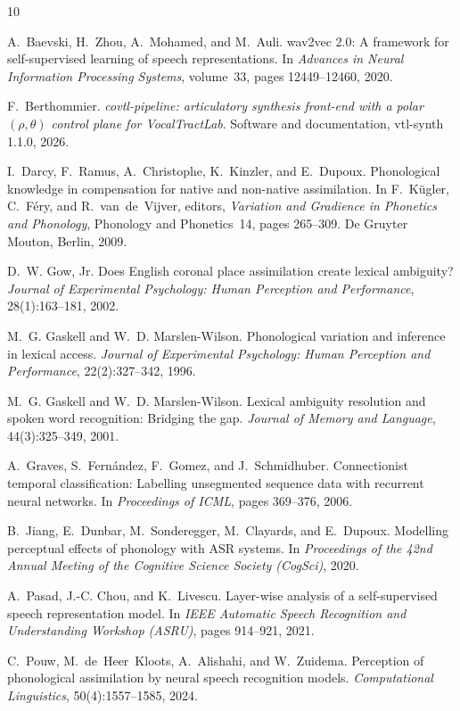 \documentclass[11pt,a4paper]{article}
\begin{document}
\begin{thebibliography}{10}
\small

A.~Baevski, H.~Zhou, A.~Mohamed, and M.~Auli.
\newblock wav2vec 2.0: A framework for self-supervised learning of speech
  representations.
\newblock In \emph{Advances in Neural Information Processing Systems},
  volume~33, pages 12449--12460, 2020.

F.~Berthommier.
\newblock \emph{covtl-pipeline: articulatory synthesis front-end with a
  polar $(\rho,\theta)$ control plane for {V}ocal{T}ract{L}ab}.
\newblock Software and documentation, vtl-synth 1.1.0, 2026.

I.~Darcy, F.~Ramus, A.~Christophe, K.~Kinzler, and E.~Dupoux.
\newblock Phonological knowledge in compensation for native and non-native
  assimilation.
\newblock In F.~K\"ugler, C.~F\'ery, and R.~van~de~Vijver, editors,
  \emph{Variation and Gradience in Phonetics and Phonology}, Phonology and
  Phonetics~14, pages 265--309. De Gruyter Mouton, Berlin, 2009.

D.~W. Gow, Jr.
\newblock Does {E}nglish coronal place assimilation create lexical
  ambiguity?
\newblock \emph{Journal of Experimental Psychology: Human Perception and
  Performance}, 28(1):163--181, 2002.

M.~G. Gaskell and W.~D. Marslen-Wilson.
\newblock Phonological variation and inference in lexical access.
\newblock \emph{Journal of Experimental Psychology: Human Perception and
  Performance}, 22(2):327--342, 1996.

M.~G. Gaskell and W.~D. Marslen-Wilson.
\newblock Lexical ambiguity resolution and spoken word recognition:
  Bridging the gap.
\newblock \emph{Journal of Memory and Language}, 44(3):325--349, 2001.

A.~Graves, S.~Fern\'andez, F.~Gomez, and J.~Schmidhuber.
\newblock Connectionist temporal classification: Labelling unsegmented
  sequence data with recurrent neural networks.
\newblock In \emph{Proceedings of ICML}, pages 369--376, 2006.

B.~Jiang, E.~Dunbar, M.~Sonderegger, M.~Clayards, and E.~Dupoux.
\newblock Modelling perceptual effects of phonology with {ASR} systems.
\newblock In \emph{Proceedings of the 42nd Annual Meeting of the Cognitive
  Science Society (CogSci)}, 2020.

A.~Pasad, J.-C. Chou, and K.~Livescu.
\newblock Layer-wise analysis of a self-supervised speech representation
  model.
\newblock In \emph{IEEE Automatic Speech Recognition and Understanding
  Workshop (ASRU)}, pages 914--921, 2021.

C.~Pouw, M.~de~Heer~Kloots, A.~Alishahi, and W.~Zuidema.
\newblock Perception of phonological assimilation by neural speech
  recognition models.
\newblock \emph{Computational Linguistics}, 50(4):1557--1585, 2024.

\end{thebibliography}
\end{document}
